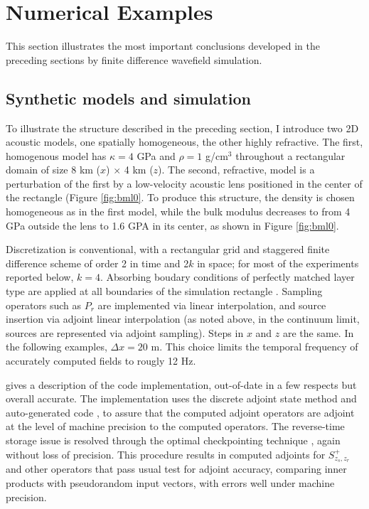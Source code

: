\section{Numerical Examples}
This section illustrates the most important conclusions developed in
the preceding sections by finite difference wavefield simulation.

\subsection{Synthetic models and simulation}
To illustrate the structure described in the preceding section, I
introduce two 2D acoustic models, one spatially homogeneous, the other
highly refractive. The first, homogenous model has $\kappa = 4$
GPa and $\rho = 1$ g/cm$^3$ throughout a rectangular domain of size 8 km ($x$) $\times$ 4 km
($z$). The second, refractive, model is a perturbation of the first by
a low-velocity acoustic lens positioned in the center of the
rectangle (Figure \ref{fig:bml0}. To produce this structure, the density is chosen
homogeneous as in the first model, while the bulk modulus decreases to
from 4 GPa outside the lens to 1.6 GPA in its center, as shown in Figure \ref{fig:bml0}.


Discretization is conventional, with a rectangular grid and staggered
finite difference scheme \cite[]{Vir:84} of order 2 in time and
2$k$ in space; for most of the experiments reported below,
$k=4$. Absorbing boudary conditions of perfectly matched layer type
are applied at all boundaries of the simulation rectangle \cite[]{Habashy:07}.
Sampling operators such as $P_r$ are implemented via linear
interpolation, and source insertion via adjoint linear interpolation
(as noted above, in the continuum limit, sources are represented via
adjoint sampling). Steps in $x$ and $z$ are the same. In the following
examples, $\Delta x = 20$ m. This choice limits the temporal frequency
of accurately computed fields to rougly 12 Hz.

\cite{GeoPros:11} gives a description of the code
implementation, out-of-date in a few respects but overall accurate.
The implementation uses the discrete adjoint state method and
auto-generated code \cite[]{TapenadeRef13}, to assure that the
computed adjoint operators are adjoint at the level of machine
precision to the computed operators. The reverse-time storage issue is
resolved through the optimal checkpointing technique
\cite[]{Griewank:book,Symes:06a-pub}, again without loss of
precision. This procedure results in computed adjoints for
$S^+_{z_s,z_r}$ and other operators that pass usual test for adjoint
accuracy, comparing inner products with pseudorandom input vectors,
with errors well under machine precision.

